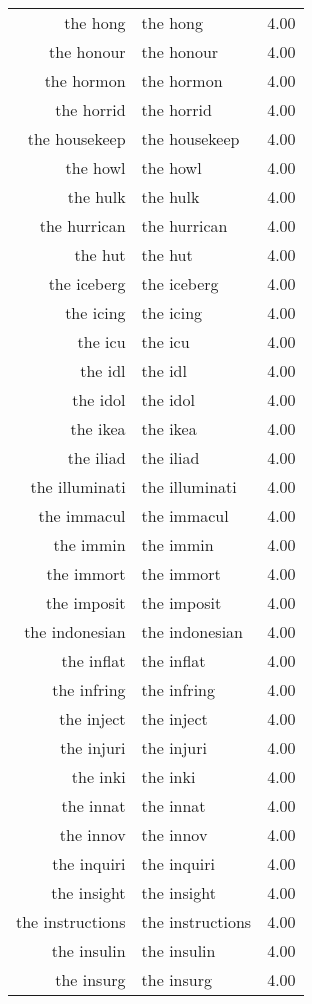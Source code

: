 \begin{table}[ht]
\begin{tabular}{rlr}
  the hong & the hong & 4.00 \\ 
  the honour & the honour & 4.00 \\ 
  the hormon & the hormon & 4.00 \\ 
  the horrid & the horrid & 4.00 \\ 
  the housekeep & the housekeep & 4.00 \\ 
  the howl & the howl & 4.00 \\ 
  the hulk & the hulk & 4.00 \\ 
  the hurrican & the hurrican & 4.00 \\ 
  the hut & the hut & 4.00 \\ 
  the iceberg & the iceberg & 4.00 \\ 
  the icing & the icing & 4.00 \\ 
  the icu & the icu & 4.00 \\ 
  the idl & the idl & 4.00 \\ 
  the idol & the idol & 4.00 \\ 
  the ikea & the ikea & 4.00 \\ 
  the iliad & the iliad & 4.00 \\ 
  the illuminati & the illuminati & 4.00 \\ 
  the immacul & the immacul & 4.00 \\ 
  the immin & the immin & 4.00 \\ 
  the immort & the immort & 4.00 \\ 
  the imposit & the imposit & 4.00 \\ 
  the indonesian & the indonesian & 4.00 \\ 
  the inflat & the inflat & 4.00 \\ 
  the infring & the infring & 4.00 \\ 
  the inject & the inject & 4.00 \\ 
  the injuri & the injuri & 4.00 \\ 
  the inki & the inki & 4.00 \\ 
  the innat & the innat & 4.00 \\ 
  the innov & the innov & 4.00 \\ 
  the inquiri & the inquiri & 4.00 \\ 
  the insight & the insight & 4.00 \\ 
  the instructions & the instructions & 4.00 \\ 
  the insulin & the insulin & 4.00 \\ 
  the insurg & the insurg & 4.00 \\ 

\end{tabular}
\end{table}
